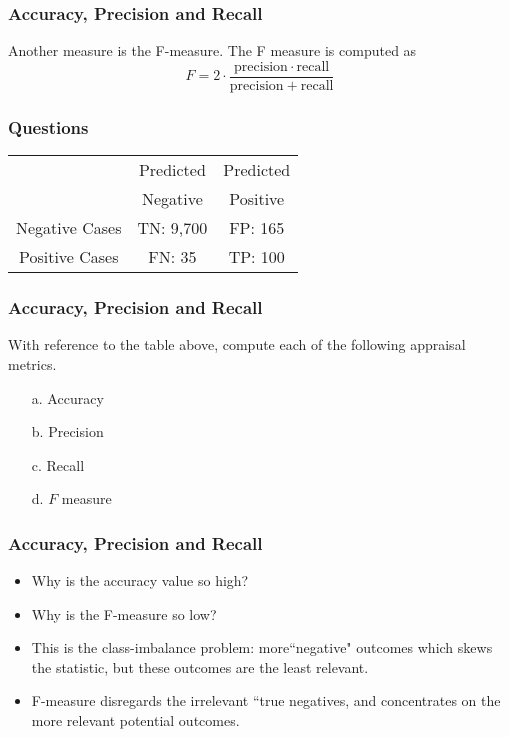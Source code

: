 \documentclass[a4]{beamer}
\begin{document}
\begin{frame}
	\frametitle{Accuracy, Precision and Recall}
	Another measure is the F-measure.
	The F measure is computed as
	\[F = 2 \cdot \frac{\mathrm{precision} \cdot \mathrm{recall}}{ \mathrm{precision} + \mathrm{recall}}\]
	
\end{frame}
\begin{frame}
	\frametitle{Questions}
	\begin{center}
		\begin{tabular}{|c|c|c|}
			\hline
			& Predicted  & Predicted \\
			& Negative & Positive \\ \hline
			Negative Cases & TN: 9,700  & FP: 165 \\ \hline
			Positive Cases & FN: 35 & TP: 100 \\ \hline
		\end{tabular} 
	\end{center}
\end{frame}
\begin{frame}
	\frametitle{Accuracy, Precision and Recall}
	
	With reference to the table above, compute each of the following appraisal metrics.
	\begin{multicols}{2} 
		\begin{itemize}
			\item[a.] Accuracy
			\item[b.] Precision
			\item[c.] Recall
			\item[d.] $F$ measure
		\end{itemize}
	\end{multicols}
\end{frame}
\begin{frame}
	\frametitle{Accuracy, Precision and Recall}
	\begin{itemize}
		\item Why is the accuracy value so high?
		\item Why is the F-measure so low?
		\item This is the class-imbalance problem: more``negative" outcomes which skews the statistic, but these outcomes are the least relevant.
		\item F-measure disregards the irrelevant ``true negatives, and concentrates on the more relevant potential outcomes.
	\end{itemize}
\end{frame}
\end{document}

